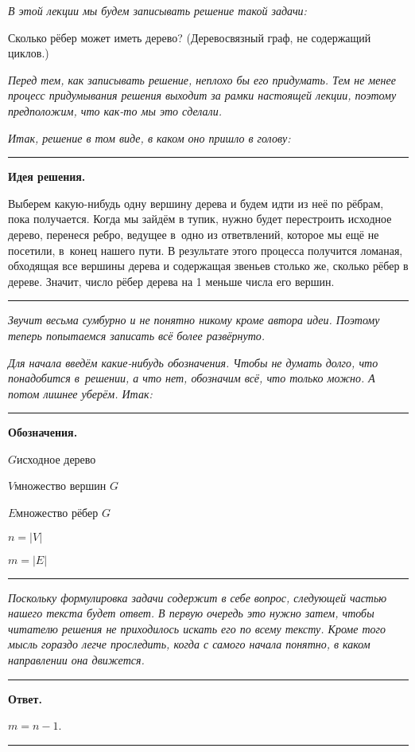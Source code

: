 \documentclass[a4paper,12pt]{article}
\begin{document}

\emph{
В этой лекции мы будем записывать решение такой задачи:
}

Сколько рёбер может иметь дерево? (Дерево\т связный граф, не содержащий циклов.)

\emph{
Перед тем, как записывать решение, неплохо бы его придумать. Тем не менее процесс придумывания решения выходит за рамки настоящей лекции, поэтому предположим, что как-то мы это сделали.
}

\emph{
Итак, решение в том виде, в каком оно пришло в голову:
}

\bigskip
\hrule
\medskip
{\bf Идея решения.}

Выберем какую-нибудь одну вершину дерева и будем идти из неё по рёбрам, пока получается. Когда мы зайдём в тупик, нужно будет перестроить исходное дерево, перенеся ребро, ведущее в~одно из ответвлений, которое мы ещё не посетили, в~конец нашего пути. В результате этого процесса получится ломаная, обходящая все вершины дерева и содержащая звеньев столько же, сколько рёбер в дереве. Значит, число рёбер дерева на 1 меньше числа его вершин.
\medskip
\hrule
\bigskip

\emph{
Звучит весьма сумбурно и не понятно никому кроме автора идеи. Поэтому теперь попытаемся записать всё более развёрнуто.
}

\emph{
Для начала введём какие-нибудь обозначения. Чтобы не думать долго, что понадобится в~решении, а что нет, обозначим всё, что только можно. А потом лишнее уберём. Итак:
}

\bigskip
\hrule
\medskip
{\bf Обозначения.}

$G$\т исходное дерево

$V$\т множество вершин $G$

$E$\т множество рёбер $G$

$n = |V|$

$m = |E|$
\medskip
\hrule
\bigskip

\emph{
Поскольку формулировка задачи содержит в себе вопрос, следующей частью нашего текста будет ответ. В первую очередь это нужно затем, чтобы читателю решения не приходилось искать его по всему тексту. Кроме того мысль гораздо легче проследить, когда с самого начала понятно, в каком направлении она движется.
}

\bigskip
\hrule
\medskip
{\bf Ответ.}

$m = n-1$.

\medskip
\hrule
\bigskip
\end{document}
